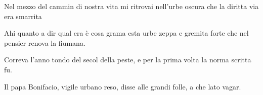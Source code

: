 \documentclass[12pt,a4paper]{article}
\begin{document}
Nel mezzo del cammin di nostra vita
mi ritrovai nell'urbe oscura
che la diritta via era smarrita

Ahi quanto a dir qual era è cosa grama
esta urbe zeppa e gremita forte
che nel pensier renova la fiumana.

Correva l'anno tondo 
del secol della peste, 
e per la prima volta
la norma scritta fu. 

Il papa Bonifacio,
vigile urbano reso,
disse alle grandi folle,
a che lato vagar.
\end{document}
